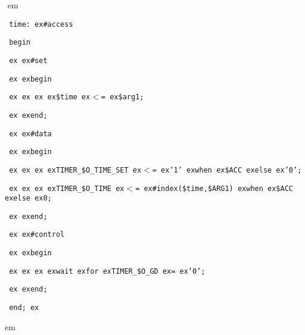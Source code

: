 \documentclass[a4paper,12pt,twoside,english]{article}
\def\s{\hskip 1.15 ex}
\begin{document}
\begin{description}
\def\prefskipu{}\def\prefskipo{}\def\prefskipa{}\def\prefskipu{\hskip10pt}\def\prefskipo{\hskip10pt}\def\prefskipa{\hskip20pt}\def\content{
\vskip-5pt{\parindent0pt\parbox{\linewidth}{\tt\smallsize\hskip10pt time:\s \#access}}
\vskip-5pt{\parindent0pt\parbox{\linewidth}{\tt\smallsize\hskip10pt begin}}
\vskip-5pt{\parindent0pt\parbox{\linewidth}{\tt\smallsize\hskip10pt \s \s \#set}}
\vskip-5pt{\parindent0pt\parbox{\linewidth}{\tt\smallsize\hskip10pt \s \s begin}}
\vskip-5pt{\parindent0pt\parbox{\linewidth}{\tt\smallsize\hskip10pt \s \s \s \s \$time\s $<$=\s \$arg1;}}
\vskip-5pt{\parindent0pt\parbox{\linewidth}{\tt\smallsize\hskip10pt \s \s end;}}
\vskip-5pt{\parindent0pt\parbox{\linewidth}{\tt\smallsize\hskip10pt \s \s \#data}}
\vskip-5pt{\parindent0pt\parbox{\linewidth}{\tt\smallsize\hskip10pt \s \s begin}}
\vskip-5pt{\parindent0pt\parbox{\linewidth}{\tt\smallsize\hskip10pt \s \s \s \s TIMER\_\$O\_TIME\_SET\s $<$=\s '1'\s when\s \$ACC\s else\s '0';}}
\vskip-5pt{\parindent0pt\parbox{\linewidth}{\tt\smallsize\hskip10pt \s \s \s \s TIMER\_\$O\_TIME\s $<$=\s \#index(\$time,\$ARG1)\s when\s \$ACC\s else\s 0;}}
\vskip-5pt{\parindent0pt\parbox{\linewidth}{\tt\smallsize\hskip10pt \s \s end;}}
\vskip-5pt{\parindent0pt\parbox{\linewidth}{\tt\smallsize\hskip10pt \s \s \#control}}
\vskip-5pt{\parindent0pt\parbox{\linewidth}{\tt\smallsize\hskip10pt \s \s begin}}
\vskip-5pt{\parindent0pt\parbox{\linewidth}{\tt\smallsize\hskip10pt \s \s \s \s wait\s for\s TIMER\_\$O\_GD\s =\s '0';}}
\vskip-5pt{\parindent0pt\parbox{\linewidth}{\tt\smallsize\hskip10pt \s \s end;}}
\vskip-5pt{\parindent0pt\parbox{\linewidth}{\tt\smallsize\hskip10pt end;\s }}
}
$ $
 em
\content
{} em
\item[\colorit{\bf Example}]
\def\prefskipu{}\def\prefskipo{}\def\prefskipa{}\def\prefskipu{\hskip10pt}\def\prefskipo{\hskip10pt}\def\prefskipa{\hskip20pt}\def\content{
\vskip-5pt{\parindent0pt\parbox{\linewidth}{\tt\smallsize\hskip10pt init:\s \#access}}
\vskip-5pt{\parindent0pt\parbox{\linewidth}{\tt\smallsize\hskip10pt begin}}
\vskip-5pt{\parindent0pt\parbox{\linewidth}{\tt\smallsize\hskip10pt \s \s \#data}}
\vskip-5pt{\parindent0pt\parbox{\linewidth}{\tt\smallsize\hskip10pt \s \s begin}}
\vskip-5pt{\parindent0pt\parbox{\linewidth}{\tt\smallsize\hskip10pt \s \s \s \s F\_\$O\_INIT\s $<$=\s '1'\s when\s \$ACC\s else\s '0';}}
\vskip-5pt{\parindent0pt\parbox{\linewidth}{\tt\smallsize\hskip10pt \s \s end;}}
\vskip-5pt{\parindent0pt\parbox{\linewidth}{\tt\smallsize\hskip10pt \s \s \#control}}
\vskip-5pt{\parindent0pt\parbox{\linewidth}{\tt\smallsize\hskip10pt \s \s begin}}
}
\end{description}
\end{document}
